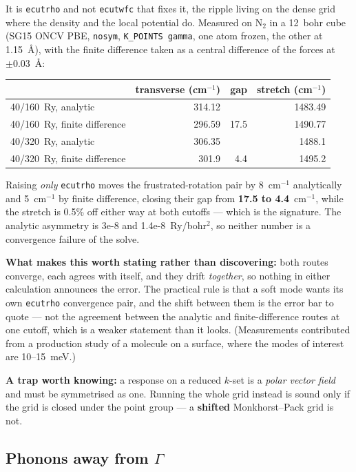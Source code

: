 \documentclass[11pt,a4paper]{article}
\newcommand{\code}[1]{\texttt{\small #1}}
\begin{document}
It is \code{ecutrho} and not \code{ecutwfc} that fixes it, the ripple living on
the dense grid where the density and the local potential do. Measured on
N$_2$ in a 12~bohr cube (SG15 ONCV PBE, \code{nosym}, \code{K\_POINTS gamma},
one atom frozen, the other at 1.15~\AA), with the finite difference taken as a
central difference of the forces at $\pm0.03$~\AA:

\begin{center}
\begin{tabular}{lrrr}
\toprule
 & transverse (cm$^{-1}$) & gap & stretch (cm$^{-1}$) \\
\midrule
40/160~Ry, analytic          & 314.12 &        & 1483.49 \\
40/160~Ry, finite difference & 296.59 & 17.5   & 1490.77 \\
40/320~Ry, analytic          & 306.35 &        & 1488.1 \\
40/320~Ry, finite difference & 301.9  & \phantom{0}4.4 & 1495.2 \\
\bottomrule
\end{tabular}
\end{center}

\noindent Raising \emph{only} \code{ecutrho} moves the frustrated-rotation pair
by 8~cm$^{-1}$ analytically and 5~cm$^{-1}$ by finite difference, closing their
gap from \textbf{17.5 to 4.4}~cm$^{-1}$, while the stretch is 0.5\% off either
way at both cutoffs --- which is the signature. The analytic asymmetry is 3e-8
and 1.4e-8~Ry/bohr$^2$, so neither number is a convergence failure of the solve.

\textbf{What makes this worth stating rather than discovering:} both routes
converge, each agrees with itself, and they drift \emph{together}, so nothing in
either calculation announces the error. The practical rule is that a soft mode
wants its own \code{ecutrho} convergence pair, and the shift between them is the
error bar to quote --- not the agreement between the analytic and
finite-difference routes at one cutoff, which is a weaker statement than it
looks. (Measurements contributed from a production study of a molecule on a
surface, where the modes of interest are 10--15~meV.)

\textbf{A trap worth knowing:} a response on a reduced $k$-set is a \emph{polar
vector field} and must be symmetrised as one. Running the whole grid instead is
sound only if the grid is closed under the point group --- a \textbf{shifted}
Monkhorst--Pack grid is not.

\subsection{Phonons away from $\Gamma$}
\end{document}
